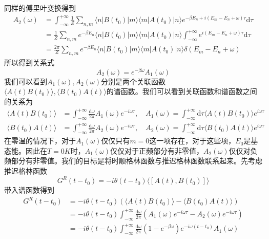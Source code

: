\documentclass{article}
\numberwithin{equation}{subsection}
\begin{document}
同样的傅里叶变换得到
\begin{equation}
    \begin{split}
        A_2(\omega)&=\int_{-\infty}^{+\infty}\frac{1}{Z}\sum_{n,m}\langle n|B(t_0)|m\rangle\langle m|A(t_0)|n\rangle e^{-\beta E_n+i(E_m-E_n+\omega)\tau}\mathrm{d}\tau\\
        &=\frac{1}{Z}\sum_{n,m}e^{-\beta E_n}\langle n|B(t_0)|m\rangle\langle m|A(t_0)|n\rangle\int_{-\infty}^{+\infty}e^{i(E_m-E_n+\omega)\tau}\mathrm{d}\tau\\
        &=\frac{2\pi}{Z}\sum_{n,m}e^{-\beta E_n}\langle n|B(t_0)|m\rangle\langle m|A(t_0)|n\rangle\delta(E_m-E_n+\omega)
    \end{split}
\end{equation}
所以得到关系式
\begin{equation}
    A_2(\omega)=e^{-\beta\omega}A_1(\omega)
\end{equation}
我们可以看到$A_1(\omega),A_2(\omega)$分别是两个关联函数$\langle A(t)B(t_0)\rangle,\langle B(t_0)A(t)\rangle$的谱函数。我们可以看到关联函数和谱函数之间的关系为
\begin{equation}
    \begin{split}
        \langle A(t)B(t_0)\rangle&=\int_{-\infty}^{+\infty}\frac{\mathrm{d}\omega}{2\pi}A_1(\omega)e^{-i\omega\tau},\quad A_1(\omega)=\int_{-\infty}^{+\infty}\mathrm{d}\tau\langle A(t)B(t_0)\rangle e^{i\omega\tau}\\
        \langle B(t_0)A(t)\rangle&=\int_{-\infty}^{+\infty}\frac{\mathrm{d}\omega}{2\pi}A_2(\omega)e^{-i\omega\tau},\quad A_2(\omega)=\int_{-\infty}^{+\infty}\mathrm{d}\tau\langle B(t_0)A(t)\rangle e^{i\omega\tau}
    \end{split}
\end{equation}
在零温的情况下，对于$A_1(\omega)$仅仅只有$m=0$这一项存在，对于这些项，$E_0$是基态能。因此在$T=0K$时，$A_1(\omega)$仅仅对于正频部分有非零值，$A_2(\omega)$仅仅对负频部分有非零值。我们的目标是将时顺格林函数与推迟格林函数联系起来。先考虑推迟格林函数
\begin{equation}
    G^{R}(t-t_0)=-i\theta(t-t_0)\langle[A(t),B(t_0)]\rangle
\end{equation}
带入谱函数得到
\begin{equation}
    \begin{split}
        G^{R}(t-t_0)&=-i\theta(t-t_0)\left(\langle A(t)B(t_0)\rangle-\langle B(t_0)A(t)\rangle\right)\\
        &=-i\theta(t-t_0)\int_{-\infty}^{+\infty}\frac{\mathrm{d}\omega}{2\pi}(A_1(\omega)e^{-i\omega\tau}-A_2(\omega)e^{-i\omega\tau })\\
        &=-i\theta(t-t_0)\int_{-\infty}^{+\infty}\frac{\mathrm{d}\omega}{2\pi}(1-e^{-\beta\omega})e^{-i\omega(t-t_0)}A_1(\omega)
    \end{split}
\end{equation}
\end{document}
